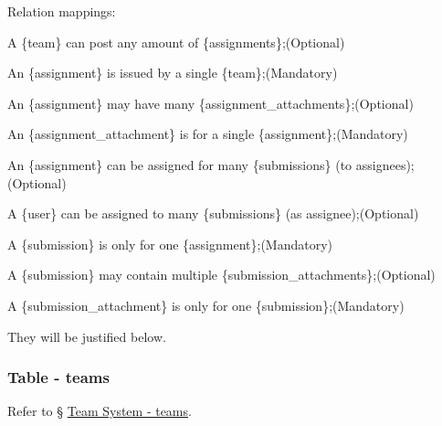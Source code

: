 \documentclass[12pt]{report}
\newcommand{\n}{\par}
\newcommand{\br}{\n\vspace{1 em}\n}
\begin{document}
Relation mappings:\n
A \{team\} can post any amount of \{assignments\};\null\hfill (Optional)\n
An \{assignment\} is issued by a single \{team\};\null\hfill (Mandatory)
\br
An \{assignment\} may have many \{assignment\_attachments\};\null\hfill (Optional)\n
An \{assignment\_attachment\} is for a single \{assignment\};\null\hfill (Mandatory)
\br
An \{assignment\} can be assigned for many \{submissions\} (to assignees);\null\hfill (Optional)\n
A \{user\} can be assigned to many \{submissions\} (as assignee);\null\hfill (Optional)\n
A \{submission\} is only for one \{assignment\};\null\hfill (Mandatory)
\br
A \{submission\} may contain multiple \{submission\_attachments\};\null\hfill (Optional)\n
A \{submission\_attachment\} is only for one \{submission\};\null\hfill (Mandatory)
\br
They will be justified below.

\subsubsection{Table - teams} \label{data-layer.design.assignment-system.teams}
Refer to \S{} \hyperref[data-layer.design.team-system.teams]{Team System - teams}.
\end{document}
